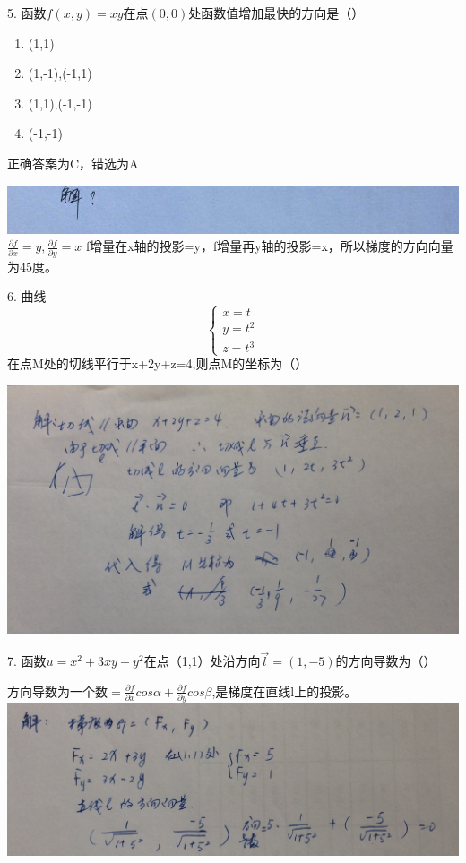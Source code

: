\documentclass[fleqn]{article}
\begin{document}
\begin{flushleft}
5. 函数$f(x,y)=xy$在点$(0,0)$处函数值增加最快的方向是（）
\begin{enumerate}
	\item (1,1)
	\item (1,-1),(-1,1)
	\item (1,1),(-1,-1)
	\item (-1,-1)
\end{enumerate}
正确答案为C，错选为A

\includegraphics[scale=0.5]{12.jpg}
$\frac{\partial{f}}{\partial{x}}=y,\frac{\partial{f}}{\partial{y}}=x$
f增量在x轴的投影=y，f增量再y轴的投影=x，所以梯度的方向向量为45度。

6. 曲线\[
\left\{\begin{array}{l}
x=t\\
y=t^2\\
z=t^3
\end{array}
\right. 
\]在点M处的切线平行于x+2y+z=4,则点M的坐标为（）

\includegraphics[scale=0.1]{28.jpg}

7. 函数$u=x^2+3xy-y^2$在点（1,1）处沿方向$\overrightarrow{l}=(1,-5)$的方向导数为（）

方向导数为一个数$=\frac{\partial f}{\partial x}cos\alpha+\frac{\partial f}{\partial y}cos\beta$,是梯度在直线l上的投影。\\

\includegraphics[scale=0.1]{29.jpg}

\end{flushleft}
\end{document}
